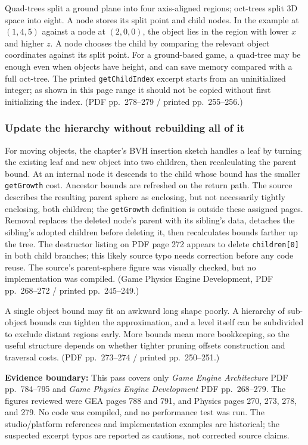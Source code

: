 Quad-trees split a ground plane into four axis-aligned regions; oct-trees split 3D space into eight. A node stores its split point and child nodes. In the example at \((1,4,5)\) against a node at \((2,0,0)\), the object lies in the region with lower \(x\) and higher \(z\). A node chooses the child by comparing the relevant object coordinates against its split point. For a ground-based game, a quad-tree may be enough even when objects have height, and can save memory compared with a full oct-tree. The printed \texttt{getChildIndex} excerpt starts from an uninitialized integer; as shown in this page range it should not be copied without first initializing the index. (PDF pp.~278--279 / printed pp.~255--256.)

\subsubsection{Update the hierarchy without rebuilding all of it}\label{update-the-hierarchy-without-rebuilding-all-of-it}

For moving objects, the chapter's BVH insertion sketch handles a leaf by turning the existing leaf and new object into two children, then recalculating the parent bound. At an internal node it descends to the child whose bound has the smaller \texttt{getGrowth} cost. Ancestor bounds are refreshed on the return path. The source describes the resulting parent sphere as enclosing, but not necessarily tightly enclosing, both children; the \texttt{getGrowth} definition is outside these assigned pages. Removal replaces the deleted node's parent with its sibling's data, detaches the sibling's adopted children before deleting it, then recalculates bounds farther up the tree. The destructor listing on PDF page 272 appears to delete \texttt{children{[}0{]}} in both child branches; this likely source typo needs correction before any code reuse. The source's parent-sphere figure was visually checked, but no implementation was compiled. (Game Physics Engine Development, PDF pp.~268--272 / printed pp.~245--249.)

A single object bound may fit an awkward long shape poorly. A hierarchy of sub-object bounds can tighten the approximation, and a level itself can be subdivided to exclude distant regions early. More bounds mean more bookkeeping, so the useful structure depends on whether tighter pruning offsets construction and traversal costs. (PDF pp.~273--274 / printed pp.~250--251.)

\textbf{Evidence boundary:} This pass covers only \emph{Game Engine Architecture} PDF pp.~784--795 and \emph{Game Physics Engine Development} PDF pp.~268--279. The figures reviewed were GEA pages 788 and 791, and Physics pages 270, 273, 278, and 279. No code was compiled, and no performance test was run. The studio/platform references and implementation examples are historical; the suspected excerpt typos are reported as cautions, not corrected source claims.

